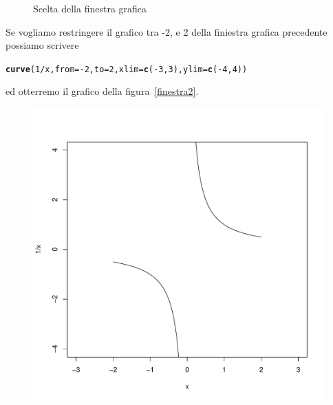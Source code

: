 \documentclass[onecolumn,11pt]{book}\usepackage[]{graphicx}\usepackage[]{color}
\makeatletter
\def\maxwidth{ %
  \ifdim\Gin@nat@width>\linewidth
    \linewidth
  \else
    \Gin@nat@width
  \fi
}
\newcommand{\hlnum}[1]{\textcolor[rgb]{0.686,0.059,0.569}{#1}}%
\newcommand{\hlopt}[1]{\textcolor[rgb]{0,0,0}{#1}}%
\newcommand{\hlstd}[1]{\textcolor[rgb]{0.345,0.345,0.345}{#1}}%
\newcommand{\hlkwc}[1]{\textcolor[rgb]{0.333,0.667,0.333}{#1}}%
\newcommand{\hlkwd}[1]{\textcolor[rgb]{0.737,0.353,0.396}{\textbf{#1}}}%
\newenvironment{kframe}{%
 \def\at@end@of@kframe{}%
 \ifinner\ifhmode%
  \def\at@end@of@kframe{\end{minipage}}%
  \begin{minipage}{\columnwidth}%
 \fi\fi%
 \def\FrameCommand##1{\hskip\@totalleftmargin \hskip-\fboxsep
 \colorbox{shadecolor}{##1}\hskip-\fboxsep
     \hskip-\linewidth \hskip-\@totalleftmargin \hskip\columnwidth}%
 \MakeFramed {\advance\hsize-\width
   \@totalleftmargin\z@ \linewidth\hsize
   \@setminipage}}%
 {\par\unskip\endMakeFramed%
 \at@end@of@kframe}
\newenvironment{knitrout}{}{} %
\makeatother
\begin{document}
\begin{itemize}
\begin{itemize}
\begin{figure}[htbp]
\begin{center}
\begin{knitrout}
\end{knitrout}
\caption{Scelta della finestra grafica}
\label{finestra}
\end{center}
\end{figure}
Se vogliamo restringere il grafico  tra -2, e 2 della finiestra grafica precedente possiamo scrivere
\begin{knitrout}
\color{fgcolor}\begin{kframe}
\begin{alltt}
\hlkwd{curve}\hlstd{(}\hlnum{1}\hlopt{/}\hlstd{x,}\hlkwc{from}\hlstd{=}\hlopt{-}\hlnum{2}\hlstd{,}\hlkwc{to}\hlstd{=}\hlnum{2}\hlstd{,}\hlkwc{xlim}\hlstd{=}\hlkwd{c}\hlstd{(} \hlopt{-}\hlnum{3}\hlstd{,}\hlnum{3}\hlstd{),} \hlkwc{ylim}\hlstd{=}\hlkwd{c}\hlstd{(}\hlopt{-}\hlnum{4}\hlstd{,}\hlnum{4}\hlstd{))}
\end{alltt}
\end{kframe}
\end{knitrout}
ed otterremo il grafico della figura~\ref{finestra2}.
\begin{figure}[htbp]
\begin{center}
\begin{knitrout}
\color{fgcolor}
\includegraphics[width=\maxwidth]{figure/unnamed-chunk-75-1} 


\end{knitrout}
\end{center}
\end{figure}
\end{itemize}
\end{itemize}
\end{document}
